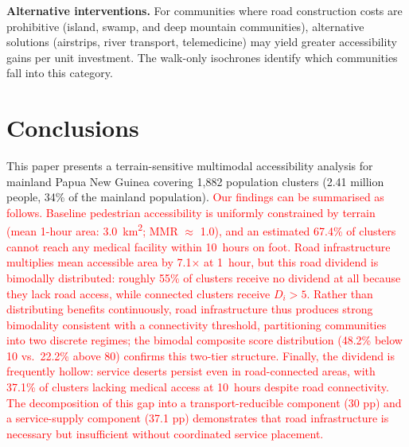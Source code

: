 \documentclass[review,3p,authoryear]{elsarticle}
\newcommand{\rev}[1]{\textcolor{red}{#1}}
\begin{document}
\textbf{Alternative interventions.} For communities where road construction costs are prohibitive (island, swamp, and deep mountain communities), alternative solutions (airstrips, river transport, telemedicine) may yield greater accessibility gains per unit investment. The walk-only isochrones identify which communities fall into this category.

\section{Conclusions}
\label{sec:conclusions}

This paper presents a terrain-sensitive multimodal accessibility analysis for mainland Papua New Guinea covering 1,882 population clusters (2.41 million people, 34\% of the mainland population). \rev{Our findings can be summarised as follows. Baseline pedestrian accessibility is uniformly constrained by terrain (mean 1-hour area: \SI{3.0}{\kilo\metre\squared}; MMR $\approx$ 1.0), and an estimated 67.4\% of clusters cannot reach any medical facility within 10~hours on foot. Road infrastructure multiplies mean accessible area by 7.1$\times$ at 1~hour, but this road dividend is bimodally distributed: roughly 55\% of clusters receive no dividend at all because they lack road access, while connected clusters receive $D_i > 5$. Rather than distributing benefits continuously, road infrastructure thus produces strong bimodality consistent with a connectivity threshold, partitioning communities into two discrete regimes; the bimodal composite score distribution (48.2\% below 10 vs.\ 22.2\% above 80) confirms this two-tier structure. Finally, the dividend is frequently hollow: service deserts persist even in road-connected areas, with 37.1\% of clusters lacking medical access at 10~hours despite road connectivity. The decomposition of this gap into a transport-reducible component (30 pp) and a service-supply component (37.1 pp) demonstrates that road infrastructure is necessary but insufficient without coordinated service placement.}
\end{document}
